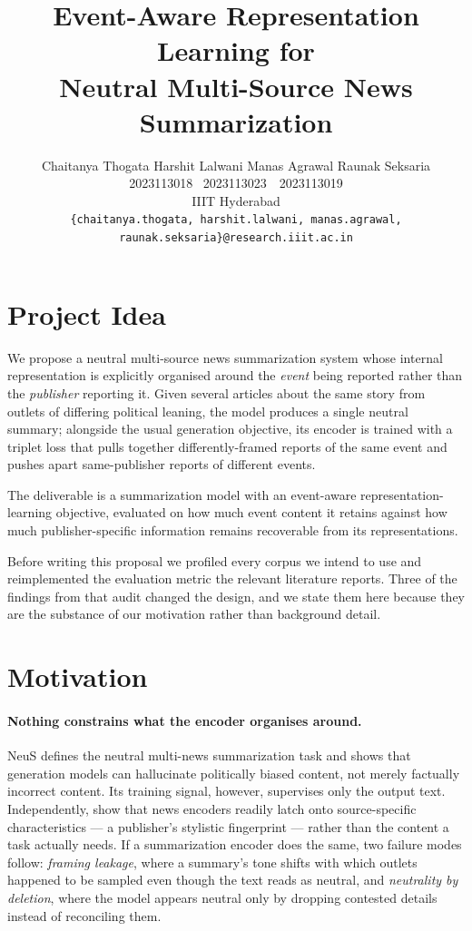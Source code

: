 \documentclass[10pt,twocolumn,a4paper]{article}
\title{\vspace{-1.2cm}\textbf{Event-Aware Representation Learning for\\
Neutral Multi-Source News Summarization}\vspace{-0.2cm}}
\author{
Chaitanya Thogata \quad Harshit Lalwani \quad Manas Agrawal \quad Raunak Seksaria \\
\small 2023113018 \quad\quad 2023111028 \quad\quad\, 2023113023 \quad\quad\,\, 2023113019 \\
\small IIIT Hyderabad \\
\small \texttt{\{chaitanya.thogata, harshit.lalwani, manas.agrawal, raunak.seksaria\}@research.iiit.ac.in}
}
\date{}
\begin{document}
\maketitle

\section{Project Idea}

We propose a neutral multi-source news summarization system whose internal
representation is explicitly organised around the \emph{event} being reported
rather than the \emph{publisher} reporting it. Given several articles about the
same story from outlets of differing political leaning, the model produces a
single neutral summary; alongside the usual generation objective, its encoder is
trained with a triplet loss that pulls together differently-framed reports of the
same event and pushes apart same-publisher reports of different events.

The deliverable is a summarization model with an event-aware
representation-learning objective, evaluated on how much event content it
retains against how much publisher-specific information remains recoverable from
its representations.

Before writing this proposal we profiled every corpus we intend to use and
reimplemented the evaluation metric the relevant literature reports. Three of the
findings from that audit changed the design, and we state them here because they
are the substance of our motivation rather than background detail.

\section{Motivation}

\paragraph{Nothing constrains what the encoder organises around.}
NeuS \cite{lee2022neus} defines the neutral multi-news summarization task and
shows that generation models can hallucinate politically biased content, not
merely factually incorrect content. Its training signal, however, supervises only
the output text. Independently, \citet{baly2020detect} show that news encoders
readily latch onto source-specific characteristics --- a publisher's stylistic
fingerprint --- rather than the content a task actually needs. If a
summarization encoder does the same, two failure modes follow: \emph{framing
leakage}, where a summary's tone shifts with which outlets happened to be
sampled even though the text reads as neutral, and \emph{neutrality by
deletion}, where the model appears neutral only by dropping contested details
instead of reconciling them.
\end{document}
